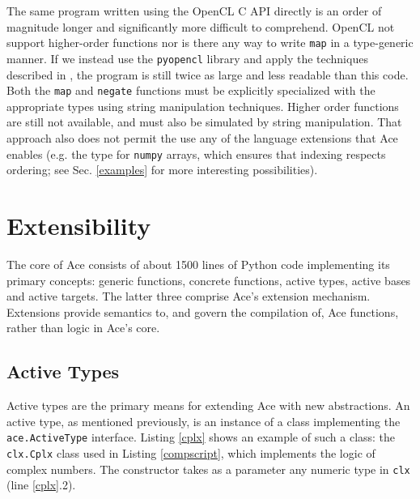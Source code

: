 \documentclass[9pt,preprint]{sigplanconf}
\begin{document}
The same program written using the OpenCL C API directly is an order of magnitude longer and significantly more difficult to comprehend. OpenCL not support higher-order functions nor is there any way to write \verb|map| in a type-generic manner. If we instead use the \verb|pyopencl| library and apply the techniques described in \cite{klockner2011pycuda}, the program is still twice as large and less readable than this code. Both the \verb|map| and \verb|negate| functions must be explicitly specialized with the appropriate types using string manipulation techniques. Higher order functions are still not available, and must also be simulated by string manipulation. That approach also does not permit the use any of the language extensions that Ace enables (e.g. the type for \verb|numpy| arrays, which ensures that indexing respects ordering; see Sec. \ref{examples} for more interesting possibilities).


\section{Extensibility}\label{att}
The core of Ace consists of about 1500 lines of Python code implementing its primary concepts: generic functions, concrete functions, active types, active bases and active targets.  The latter three comprise Ace's extension mechanism. Extensions provide semantics to, and govern the compilation of, Ace functions, rather than logic in Ace's core. %

\subsection{Active Types}\label{atypes}
Active types are the primary means for extending Ace with new abstractions. An active type, as mentioned previously, is an instance of a class implementing the \verb|ace.ActiveType| interface. Listing \ref{cplx} shows an example of such a class: the \verb|clx.Cplx| class used in Listing \ref{compscript}, which implements the logic of complex numbers. The constructor takes as a parameter any numeric type in \verb|clx| (line \ref{cplx}.2). 
\end{document}
